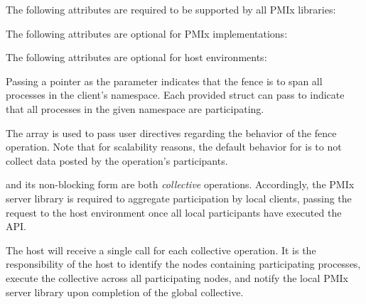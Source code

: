 \returnsimple

\reqattrstart
The following attributes are required to be supported by all \ac{PMIx} libraries:


\reqattrend

\optattrstart
The following attributes are optional for \ac{PMIx} implementations:



The following attributes are optional for host environments:


\optattrend

\descr

Passing a  pointer as the  parameter indicates that the fence is to span all processes in the client's namespace.
Each provided  struct can pass  to indicate that all processes in the given namespace are participating.

The  array is used to pass user directives regarding the behavior of the fence operation. Note that for scalability reasons, the default behavior for  is to not collect data posted by the operation's participants.

\adviceimplstart
{} and its non-blocking form are both \emph{collective} operations. Accordingly, the \ac{PMIx} server library is required to aggregate participation by local clients, passing the request to the host environment once all local participants have executed the \ac{API}.
\adviceimplend

\advicermstart
The host will receive a single call for each collective operation. It is the responsibility of the host to identify the nodes containing participating processes, execute the collective across all participating nodes, and notify the local \ac{PMIx} server library upon completion of the global collective.
\advicermend


\section{}

\summary

